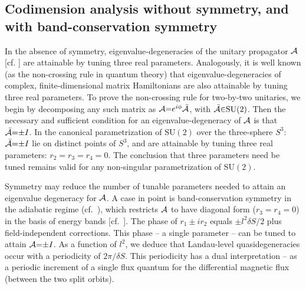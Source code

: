 \documentclass[aps, showpacs, twocolumn, notitlepage, superscriptaddress]{revtex4-1}
\begin{document}
\subsection{Codimension analysis without symmetry, and with band-conservation symmetry}\label{sec:introducecodimension}


In the absence of symmetry, eigenvalue-degeneracies of the unitary propagator ${\cal A}$ [cf. ] are attainable by tuning three real parameters. Analogously, it is well known (as the non-crossing rule in quantum theory\cite{neumann2000behaviour}) that eigenvalue-degeneracies of complex, finite-dimensional matrix Hamiltonians are also attainable by tuning three real parameters.
To prove the non-crossing rule for two-by-two unitaries, we begin by decomposing any such matrix as ${\cal A}{=}e^{i\phi}{\cal \bar{A}}$, with  ${\cal \bar{A}}{\in}\text{SU}(2)$. Then the necessary and sufficient condition for an eigenvalue-degeneracy of ${\cal A}$ is that ${\cal \bar{A}}{=}{\pm}I$. In the canonical parametrization of $\text{SU}(2)$ over the three-sphere $S^3$: 
${\cal \bar{A}}{=}{\pm}I$ lie on distinct points of $S^3$, and are attainable by tuning three real parameters: $r_2{=}r_3{=}r_4{=}0$. The conclusion that three parameters need be tuned remains valid for any  non-singular parametrization of SU$(2)$.
 
Symmetry may reduce the number of tunable parameters needed to attain an eigenvalue degeneracy for ${\cal A}$. A case in point is band-conservation symmetry in the adiabatic regime (cf.\ ), which restricts ${\cal A}$ to have diagonal form  ($r_3{=}r_4{=}0$) in the basis of energy bands [cf.\ ]. The phase of $r_1{\pm}ir_2$ equals ${\pm} l^2\delta S/2$ plus field-independent corrections. This  phase -- a single parameter --  can be  tuned to attain ${\cal A}{=}{\pm}I$. As a function of $l^2$, we deduce that Landau-level quasidegeneracies occur with a periodicity of $2\pi/\delta S$. This periodicity  has a dual interpretation -- as a periodic increment of a single flux quantum for the differential magnetic flux (between the two split orbits).
\end{document}
